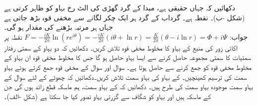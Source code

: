 \quad {}\quad
دکھائیں کہ  جہاں  حقیقی ہے، مبدا کے گرد گھڑی کی الٹ رخ بہاو کو ظاہر کرتی ہے (شکل -ب)۔  نقطہ   ہے۔ گرداب کے گرد ہر ایک چکر لگانے سے مخفی قوہ بڑھ جاتی ہے جہاں ہر مرتبہ  بڑھنے کی مقدار  ہو گی۔\\
جواب:\quad
$F=-\tfrac{iK}{2\pi}\ln (re^{i\theta})=-\tfrac{iK}{2\pi}(i\theta+\ln r)=\tfrac{K}{2\pi}(\theta-i\ln r)=\Phi+i\Psi$
\quad
نقطہ  پر اکائی زور کی منبع کے بہاو کا مخلوط مخفی قوہ تلاش کریں۔
\quad
دکھائیں کہ دو بہاو کے سمتی رفتار سمتیات کا سمتی مجموعہ حاصل کرنے سے  ایسا بہاو حاصل ہو گا جس کا مخلوط مخفی قوہ ان بہاو کے مخلوط مخفی قوہ کو جمع کرنے سے حاصل ہوتا ہے۔ 
\quad
سوال  اور سوال  کے مخفی قوہ جمع کرتے ہوئے بہاو سمت کی ترسیم کھینچیں۔
\quad
{} کے بہاو کی بہاو سمت تلاش کریں۔دکھائیں کہ چھوٹے  کے لئے  سوال  کے بہاو سمت موجودہ بہاو سمت کی طرح ہیں۔
\quad
دکھائیں کہ  کے بہاو سمت،  ہم ماسکہ قطع زائد  ہوں گی جن کے ماسکہ  ہیں اور بہاو کو شگاف سے گزرتی بہاو تصور کیا جا سکتا ہے (شکل -الف)۔
